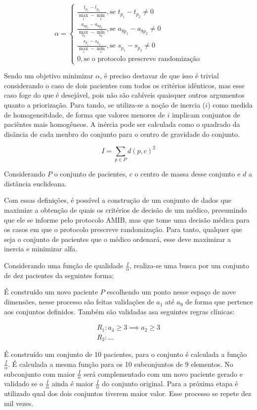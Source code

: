 \documentclass[12pt]{article}
\begin{document}
\[
\alpha = \begin{cases}
    \frac{t_{p_1} - t_{p_2}}{\max_t - \min_t}, \text{se } t_{p_1} - t_{p_2} \neq 0 \\
    \frac{a_{8p_1} - a_{8p_2}}{\max_{a_8} - \min_{a_8}}, \text{se } a_{8p_1} - a_{8p_2} \neq 0 \\
    \frac{s_{p_1} - s_{p_2}}{\max_s - \min_s}, \text{se } s_{p_1} - s_{p_2} \neq 0 \\
    0, \text{se o protocolo prescreve randomização}
\end{cases}
\] 

Sendo um objetivo minimizar $\alpha$, é preciso destavar de que isso é trivial considerando o caso de dois pacientes com todos os critérios idênticos, mas esse caso foge do que é desejável, pois não são cabíveis quaisquer outros argumentos quanto a priorização.
Para tando, se utiliza-se a noção de inercia ($i$) como medida de homogeneitdade, de forma que valores menores de $i$ implicam conjuntos de paciêntes mais homogêneos.
A inércia pode ser calculada como o quadrado da disância de cada menbro do conjunto para o centro de gravidade do conjunto.

\[
I = \sum_{p \in P}d(p, c)^2
\] 

Considerando $P$ o conjunto de pacientes, $c$ o centro de massa desse conjunto e $d$ a distância euclideana.

Com essas definições, é possível a construção de um conjunto de dados que maximize a obtenção de quais os critérios de decisão de um médico, presumindo que ele se informe pelo protocolo AMIB, mas que tome uma decisão médica para os casos em que o protocolo prescreve randomização.
Para tanto, qualquer que seja o conjunto de pacientes que o médico ordenará, esse deve maximizar a inercia e minimizar alfa.

Considerando uma função de qualidade $\frac{I}{\alpha}$, realiza-se uma busca por um conjunto de dez pacientes da seguintes forma:

É construído um novo paciente $P$ escolhendo um ponto nesse espaço de nove dimensões, nesse processo são feitas validações de $a_1$ até $a_9$ de forma que pertence aos conjuntos definidos. 
Também são validadas asa seguintes regras clínicas:

\[
\begin{split}
    R_1: a_4 \ge 3 \implies a_2 \ge 3 \\
    R_2: \ldots
\end{split}
\]

É construído um conjunto de 10 pacientes, para o conjunto é calculada a função $\frac{I}{\alpha}$.
É calculada a mesma função para os 10 subconjuntos de 9 elementos.
No subconjunto com maior $\frac{I}{\alpha}$ será complementado com um novo paciente gerado e validado se o $\frac{I}{\alpha}$ ainda é maior $\frac{I}{\alpha}$ do conjunto original.
Para a próxima etapa é utilizado qual dos dois conjuntos tiverem maior valor.
Esse processo se repete dez mil vezes.
\end{document}
